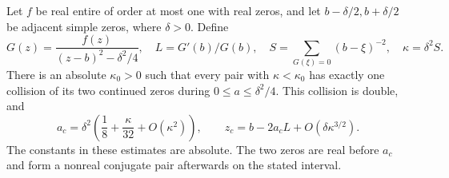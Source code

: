 \begin{theorem}\label{thm:isolated-pair}
Let $f$ be real entire of order at most one with real zeros, and let $b-\delta/2,b+\delta/2$ be adjacent simple zeros, where $\delta>0$. Define
\[
 G(z)=\frac{f(z)}{(z-b)^2-\delta^2/4},\quad
 L=G'(b)/G(b),\quad S=\sum_{G(\xi)=0}(b-\xi)^{-2},\quad
 \kappa=\delta^2S.
\]
There is an absolute $\kappa_0>0$ such that every pair with $\kappa<\kappa_0$ has exactly one collision of its two continued zeros during $0\le a\le\delta^2/4$. This collision is double, and
\[
 a_c=\delta^2\left(\frac18+\frac\kappa{32}+O(\kappa^2)\right),
 \qquad z_c=b-2a_cL+O(\delta\kappa^{3/2}).
\]
The constants in these estimates are absolute. The two zeros are real before $a_c$ and form a nonreal conjugate pair afterwards on the stated interval.
\end{theorem}
